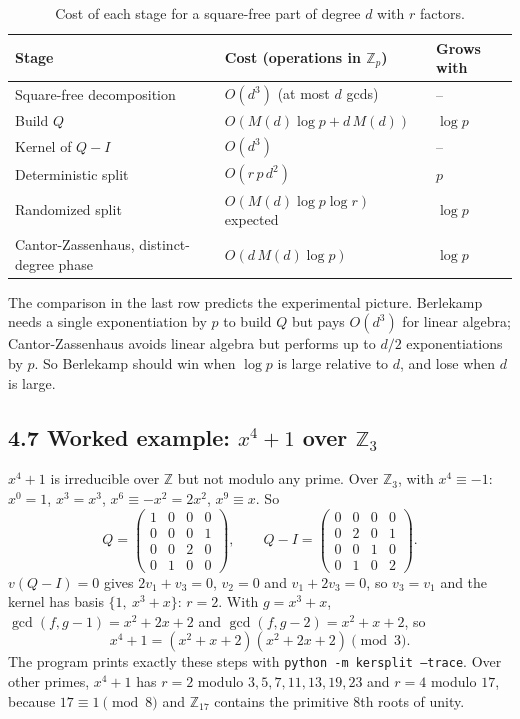 \documentclass[11pt,a4paper]{article}
\newcommand{\Zp}{\mathbb{Z}_p}
\begin{document}
\begin{table}[H]
\centering
\small
\begin{tabular}{lll}
\toprule
Stage & Cost (operations in $\Zp$) & Grows with \\
\midrule
Square-free decomposition & $O(d^3)$ (at most $d$ gcds) & -- \\
Build $Q$ & $O(M(d)\log p + d\,M(d))$ & $\log p$ \\
Kernel of $Q - I$ & $O(d^3)$ & -- \\
Deterministic split & $O(r\,p\,d^2)$ & $p$ \\
Randomized split & $O(M(d)\log p \log r)$ expected & $\log p$ \\
\midrule
Cantor-Zassenhaus, distinct-degree phase & $O(d\,M(d)\log p)$ & $\log p$ \\
\bottomrule
\end{tabular}
\caption{Cost of each stage for a square-free part of degree $d$ with $r$ factors.}
\end{table}

The comparison in the last row predicts the experimental picture. Berlekamp needs a single
exponentiation by $p$ to build $Q$ but pays $O(d^3)$ for linear algebra; Cantor-Zassenhaus avoids
linear algebra but performs up to $d/2$ exponentiations by $p$. So Berlekamp should win when
$\log p$ is large relative to $d$, and lose when $d$ is large.

\subsection*{4.7 Worked example: $x^4 + 1$ over $\mathbb{Z}_3$}

$x^4 + 1$ is irreducible over $\mathbb{Z}$ but not modulo any prime. Over $\mathbb{Z}_3$, with
$x^4 \equiv -1$: $x^0 = 1$, $x^3 = x^3$, $x^6 \equiv -x^2 = 2x^2$, $x^9 \equiv x$. So
\[
  Q = \begin{pmatrix} 1&0&0&0 \\ 0&0&0&1 \\ 0&0&2&0 \\ 0&1&0&0 \end{pmatrix}, \qquad
  Q - I = \begin{pmatrix} 0&0&0&0 \\ 0&2&0&1 \\ 0&0&1&0 \\ 0&1&0&2 \end{pmatrix}.
\]
$v (Q - I) = 0$ gives $2v_1 + v_3 = 0$, $v_2 = 0$ and $v_1 + 2v_3 = 0$, so $v_3 = v_1$ and the
kernel has basis $\{1,\ x^3 + x\}$: $r = 2$. With $g = x^3 + x$,
$\gcd(f, g - 1) = x^2 + 2x + 2$ and $\gcd(f, g - 2) = x^2 + x + 2$, so
\[
  x^4 + 1 = (x^2 + x + 2)(x^2 + 2x + 2) \pmod 3 .
\]
The program prints exactly these steps with \texttt{python -m kersplit --trace}. Over other primes,
$x^4 + 1$ has $r = 2$ modulo $3, 5, 7, 11, 13, 19, 23$ and $r = 4$ modulo $17$, because
$17 \equiv 1 \pmod 8$ and $\mathbb{Z}_{17}$ contains the primitive 8th roots of unity.
\end{document}
